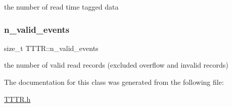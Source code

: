 the number of read time tagged data 

\mbox{\label{class_t_t_t_r_aabb647d22bb6cb17ff1b843c93b9de3a}} 
\subsubsection{\texorpdfstring{n\+\_\+valid\+\_\+events}{n\_valid\_events}}
{\footnotesize\ttfamily size\+\_\+t T\+T\+T\+R\+::n\+\_\+valid\+\_\+events\hspace{0.3cm}{\ttfamily [protected]}}



the number of valid read records (excluded overflow and invalid records) 



The documentation for this class was generated from the following file\+:\begin{DoxyCompactItemize}
\item 
\hyperlink{_t_t_t_r_8h}{T\+T\+T\+R.\+h}\end{DoxyCompactItemize}
